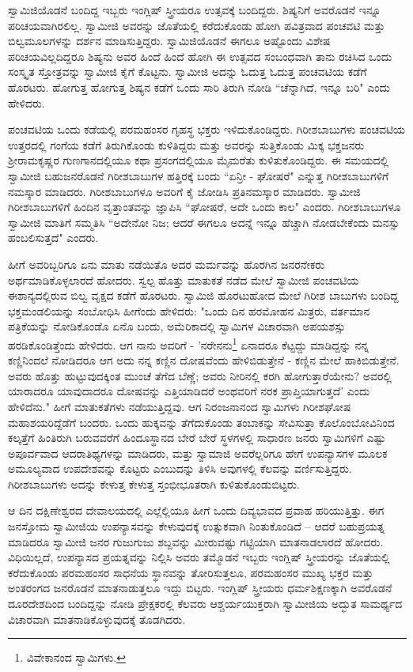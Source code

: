ಸ್ವಾಮಿಜಿಯೊಡನೆ ಬಂದಿದ್ದ ಇಬ್ಬರು ಇಂಗ್ಲಿಷ್ ಸ್ತ್ರೀಯರೂ ಉತ್ಸವಕ್ಕೆ ಬಂದಿದ್ದರು. ಶಿಷ್ಯನಿಗೆ ಅವರೊಡನೆ ಇನ್ನೂ ಪರಿಚಯವಾಗಿರಲಿಲ್ಲ. ಸ್ವಾಮೀಜಿ ಅವರನ್ನು ಜೊತೆಯಲ್ಲಿ ಕರೆದುಕೊಂಡು ಹೋಗಿ ಪವಿತ್ರವಾದ ಪಂಚವಟಿ ಮತ್ತು ಬಿಲ್ವಮೂಲಗಳನ್ನು ದರ್ಶನ ಮಾಡಿಸುತ್ತಿದ್ದರು. ಸ್ವಾಮಿಜಿಯೊಡನೆ ಈಗಲೂ ಅಷ್ಟೊಂದು ವಿಶೇಷ ಪರಿಚಯವಿಲ್ಲದಿದ್ದರೂ ಶಿಷ್ಯನು ಅವರ ಹಿಂದೆ ಹಿಂದೆ ಹೋಗಿ ಈ ಉತ್ಸವದ ಸಂಬಂಧವಾಗಿ ತಾನು ರಚಿಸಿದ ಒಂದು ಸಂಸ್ಕೃತ ಸ್ತೋತ್ರವನ್ನು ಸ್ವಾಮೀಜಿ ಕೈಗೆ ಕೊಟ್ಟನು. ಸ್ವಾಮೀಜಿ ಅದನ್ನು ಓದುತ್ತ ಓದುತ್ತ ಪಂಚವಟಿಯ ಕಡೆಗೆ ಹೊರಟರು. ಹೋಗುತ್ತ ಹೋಗುತ್ತ ಶಿಷ್ಯನ ಕಡೆಗೆ ಒಂದು ಸಾರಿ ತಿರುಗಿ ನೋಡಿ “ಚೆನ್ನಾಗಿದೆ, ಇನ್ನೂ ಬರಿ" ಎಂದು ಹೇಳಿದರು.

ಪಂಚವಟಿಯ ಒಂದು ಕಡೆಯಲ್ಲಿ ಪರಮಹಂಸರ ಗೃಹಸ್ಥ ಭಕ್ತರು ಇಳಿದುಕೊಂಡಿದ್ದರು. ಗಿರೀಶಬಾಬುಗಳು ಪಂಚವಟಿಯ ಉತ್ತರದಲ್ಲಿ ಗಂಗೆಯ ಕಡೆಗೆ ತಿರುಗಿಕೊಂಡು ಕುಳಿತಿದ್ದರು ಮತ್ತು ಅವರನ್ನು ಸುತ್ತಿಕೊಂಡು ಮಿಕ್ಕ ಭಕ್ತಜನರು ಶ‍್ರೀರಾಮಕೃಷ್ಣರ ಗುಣಗಾನದಲ್ಲಿಯೂ ಕಥಾ ಪ್ರಸಂಗದಲ್ಲಿಯೂ ಮೈಮರೆತು ಕುಳಿತುಕೊಂಡಿದ್ದರು. ಈ ಸಮಯದಲ್ಲಿ ಸ್ವಾಮೀಜಿ ಬಹುಜನರೊಡನೆ ಗಿರೀಶಬಾಬುಗಳ ಹತ್ತಿರಕ್ಕೆ ಬಂದು “ಏನ್ರೀ - ಘೋಷರೆ" ಎನ್ನುತ್ತ ಗಿರೀಶಬಾಬುಗಳಿಗೆ ನಮಸ್ಕಾರ ಮಾಡಿದರು. ಗಿರೀಶಬಾಬುಗಳೂ ಅವರಿಗೆ ಕೈ ಜೋಡಿಸಿ ಪ್ರತಿನಮಸ್ಕಾರ ಮಾಡಿದರು. ಸ್ವಾಮೀಜಿ ಗಿರೀಶಬಾಬುಗಳಿಗೆ ಹಿಂದಿನ ವೃತ್ತಾಂತವನ್ನು ಜ್ಞಾಪಿಸಿ “ಘೋಷರೆ, ಅದೇ ಒಂದು ಕಾಲ" ಎಂದರು. ಗಿರೀಶಬಾಬುಗಳೂ ಸ್ವಾಮೀಜಿ ಮಾತಿಗೆ ಸಮ್ಮತಿಸಿ “ಅದೇನೋ ನಿಜ; ಆದರೆ ಈಗಲೂ ಅದನ್ನೆ ಇನ್ನೂ ಹೆಚ್ಚಾಗಿ ನೋಡಬೇಕೆಂದು ಮನಸ್ಸು ಹಂಬಲಿಸುತ್ತದೆ" ಎಂದರು.

ಹೀಗೆ ಅವರಿಬ್ಬರಿಗೂ ಏನು ಮಾತು ನಡೆಯಿತೊ ಅದರ ಮರ್ಮವನ್ನು ಹೊರಗಿನ ಜನರನೇಕರು ಅರ್ಥಮಾಡಿಕೊಳ್ಳಲಾರದೆ ಹೋದರು. ಸ್ವಲ್ಪ ಹೊತ್ತು ಮಾತುಕತೆ ನಡೆದ ಮೇಲೆ ಸ್ವಾಮೀಜಿ ಪಂಚವಟಿಯ ಈಶಾನ್ಯದಲ್ಲಿರುವ ಬಿಲ್ವ ವೃಕ್ಷದ ಕಡೆಗೆ ಹೊರಟರು. ಸ್ವಾಮಿಜಿ ಹೊರಟುಹೋದ ಮೇಲೆ ಗಿರೀಶ ಬಾಬುಗಳು ಬಂದಿದ್ದ ಭಕ್ತಮಂಡಲಿಯನ್ನು ಸಂಬೋಧಿಸಿ ಹೀಗೆಂದು ಹೇಳಿದರು: "ಒಂದು ದಿನ ಹರಮೋಹನ ಮಿತ್ರರು, ವರ್ತಮಾನ ಪತ್ರಿಕೆಯನ್ನು ನೋಡಿಕೊಂಡೊ ಏನೊ ಬಂದು, ಅಮೆರಿಕಾದಲ್ಲಿ ಸ್ವಾಮಿಗಳ ವಿಚಾರವಾಗಿ ಅಪಯಶಸ್ಸು ಹರಡಿಕೊಂಡಿತ್ತೆಂದು ಹೇಳಿದರು. ಆಗ ನಾನು ಅವರಿಗೆ - 'ನರೇನನು\footnote{ವಿವೇಕಾನಂದ ಸ್ವಾಮಿಗಳು.} ಏನಾದರೂ ಕೆಟ್ಟದ್ದು ಮಾಡಿದ್ದನ್ನು ನನ್ನ ಕಣ್ಣಿನಿಂದಲೆ ನೋಡಿದರೂ ಆಗ ಅದು ನನ್ನ ಕಣ್ಣಿನ ದೋಷವೆಂದು ಹೇಳಿಬಿಡುತ್ತೇನೆ - ಕಣ್ಣಿನ ಮೇಲೆ ಹಾಕಿಬಿಡುತ್ತೇನೆ. ಅವರು ಹೊತ್ತು ಹುಟ್ಟುವುದಕ್ಕಿಂತ ಮುಂಚೆ ತೆಗೆದ ಬೆಣ್ಣೆ; ಅವರು ನೀರಿನಲ್ಲಿ ಕರಗಿ ಹೋಗುತ್ತಾರೆಯೇನು? ಅವರಲ್ಲಿ ಯಾರಾದರೂ ಯಾವುದಾದರೂ ದೋಷವನ್ನು ಎತ್ತಿಯಾಡಿದರೆ ಅಂಥವರಿಗೆ ನರಕ ಪ್ರಾಪ್ತಿಯಾಗುತ್ತದೆ' ಎಂದು ಹೇಳಿದೆನು." ಹೀಗೆ ಮಾತುಕತೆಗಳು ನಡೆಯುತ್ತಿದ್ದವು. ಆಗ ನಿರಂಜನಾನಂದ ಸ್ವಾಮಿಗಳು ಗಿರೀಶಘೋಷ ಮಹಾಶಯರಿದ್ದೆಡೆಗೆ ಬಂದರು. ಒಂದು ಹುಕ್ಕವನ್ನು ತೆಗೆದುಕೊಂಡು ತಂಬಾಕನ್ನು ಸೇವಿಸುತ್ತಾ ಕೊಲೊಂಬೋವಿನಿಂದ ಕಲ್ಕತ್ತೆಗೆ ಹಿಂತಿರುಗಿ ಬರುವವರೆಗೆ ಹಿಂದೂಸ್ಥಾನದ ಬೇರೆ ಬೇರೆ ಸ್ಥಳಗಳಲ್ಲಿ ಸಾಧಾರಣ ಜನರು ಸ್ವಾಮಿಗಳಿಗೆ ಎಷ್ಟು ಅಪೂರ್ವವಾದ ಆದರಾತಿಥ್ಯಗಳನ್ನು ಮಾಡಿದರು, ಮತ್ತು ಸ್ವಾಮಾಜಿ ಅವರೆಲ್ಲರಿಗೂ ಹೇಗೆ ಉಪನ್ಯಾಸಗಳ ಮೂಲಕ ಅಮೂಲ್ಯವಾದ ಉಪದೇಶವನ್ನು ಕೊಟ್ಟರು ಎಂಬುದನ್ನು ತಿಳಿಸಿ ಅವುಗಳಲ್ಲಿ ಕೆಲವನ್ನು ವರ್ಣಿಸುತ್ತಿದ್ದರು. ಗಿರೀಶಬಾಬುಗಳು ಅದನ್ನು ಕೇಳುತ್ತ ಕೇಳುತ್ತ ಸ್ತಂಭೀಭೂತರಾಗಿ ಕುಳಿತುಕೊಂಡುಬಿಟ್ಟರು.

ಆ ದಿನ ದಕ್ಷಿಣೇಶ್ವರದ ದೇವಾಲಯದಲ್ಲಿ ಎಲ್ಲೆಲ್ಲಿಯೂ ಹೀಗೆ ಒಂದು ದಿವ್ಯಭಾವದ ಪ್ರವಾಹ ಹರಿಯುತ್ತಿತ್ತು. ಈಗ ಜನಸ್ತೋಮ ಸ್ವಾಮೀಜಿಯ ಉಪನ್ಯಾಸವನ್ನು ಕೇಳುವುದಕ್ಕೆ ಉತ್ಸುಕವಾಗಿ ನಿಂತುಕೊಂಡಿದೆ – ಆದರೆ ಬಹುಪ್ರಯತ್ನ ಮಾಡಿದರೂ ಸ್ವಾಮೀಜಿ ಜನರ ಗುಜುಗುಜು ಶಬ್ದವನ್ನು ಮೀರುವಷ್ಟು ಗಟ್ಟಿಯಾಗಿ ಮಾತನಾಡಲಾರದೆ ಹೋದರು. ವಿಧಿಯಿಲ್ಲದೆ, ಉಪನ್ಯಾಸದ ಪ್ರಯತ್ನವನ್ನು ನಿಲ್ಲಿಸಿ ಅವರು ತಮ್ಮೊಡನೆ ಇಬ್ಬರು ಇಂಗ್ಲಿಷ್ ಸ್ತ್ರೀಯರನ್ನು ಜೊತೆಯಲ್ಲಿ ಕರೆದುಕೊಂಡು ಪರಮಹಂಸರ ಸಾಧನೆಯ ಸ್ಥಾನವನ್ನು ತೋರಿಸುತ್ತಲೂ, ಪರಮಹಂಸರ ಮುಖ್ಯ ಭಕ್ತರ ಮತ್ತು ಅಂತರಂಗದ ಜನರೊಡನೆ ಮಾತನಾಡುತ್ತಲೂ ಇದ್ದು ಬಿಟ್ಟರು. ಇಂಗ್ಲಿಷ್ ಸ್ತ್ರೀಯರು ಧರ್ಮಶಿಕ್ಷಣಕ್ಕಾಗಿ ಅವರೊಡನೆ ದೂರದೇಶದಿಂದ ಬಂದಿದ್ದನ್ನು ನೋಡಿ ಪ್ರೇಕ್ಷಕರಲ್ಲಿ ಕೆಲವರು ಆಶ್ಚರ್ಯಯುಕ್ತರಾಗಿ ಸ್ವಾಮೀಜಿಯ ಅದ್ಭುತ ಸಾಮರ್ಥ್ಯದ ವಿಚಾರವಾಗಿ ಮಾತನಾಡಿಕೊಳ್ಳುವುದಕ್ಕೆ ತೊಡಗಿದರು.

